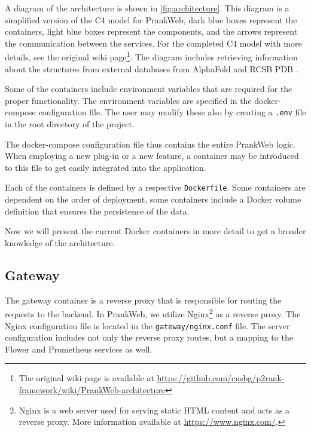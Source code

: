 A diagram of the architecture is shown in \cref{fig:architecture}. This diagram is a simplified version of the C4 model \cite{vazquez2020c4} for PrankWeb, dark blue boxes represent the containers, light blue boxes represent the components, and the arrows represent the communication between the services. For the completed C4 model with more details, see the original wiki page\footnote{The original wiki page is available at \url{https://github.com/cusbg/p2rank-framework/wiki/PrankWeb-architecture}}. The diagram includes retrieving information about the structures from external databases from AlphaFold \cite{david2022alphafold} and RCSB PDB \cite{kouranov2006rcsb}.


Some of the containers include environment variables that are required for the proper functionality. The environment variables are specified in the docker-compose configuration file. The user may modify these also by creating a \texttt{.env} file in the root directory of the project.

The docker-compose configuration file thus contains the entire PrankWeb logic. When employing a new plug-in or a new feature, a container may be introduced to this file to get easily integrated into the application.

Each of the containers is defined by a respective \texttt{Dockerfile}. Some containers are dependent on the order of deployment, some containers include a Docker volume definition that ensures the persistence of the data.

Now we will present the current Docker containers in more detail to get a broader knowledge of the architecture.

\subsection{Gateway}
\label{subsec:gateway}

The gateway container is a reverse proxy that is responsible for routing the requests to the backend. In PrankWeb, we utilize Nginx\footnote{Nginx is a web server used for serving static HTML content and acts as a reverse proxy. More information available at \url{https://www.nginx.com/}.} as a reverse proxy. The Nginx configuration file is located in the \texttt{gateway/nginx.conf} file. The server configuration includes not only the reverse proxy routes, but a mapping to the Flower and Prometheus services as well.

